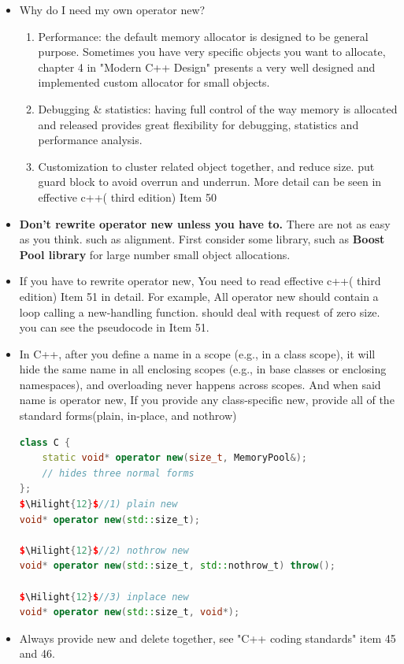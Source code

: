 \documentclass[a4paper,12pt,twoside]{book}
\newcommand{\Hilight}[1]{\makebox[0pt][l]{\color{yellow}\rule[-3pt]{#1em}{11pt}}}
\begin{document}
\begin{itemize}
	\item Why do I need my own operator new?
	\begin{enumerate}
		\item Performance: the default memory allocator is designed to be general purpose. Sometimes you have very specific objects you want to allocate, chapter 4 in "Modern C++ Design" presents a very well designed and implemented custom allocator for small objects.
		
		\item Debugging \& statistics: having full control of the way memory is allocated and released provides great flexibility for debugging, statistics and performance analysis.
		
		\item Customization to cluster related object together, and reduce size. put guard block to avoid overrun and underrun. More detail can be seen in effective c++( third edition) Item 50
	\end{enumerate}
	
	\item \textbf{Don't rewrite operator new unless you have to.} There are not as easy as you think. such as alignment. First consider some library, such as \textbf{Boost Pool library} for large number small object allocations. 
	
	\item If you have to rewrite operator new, You need to read  effective c++( third edition) Item 51 in detail. For example, All operator new should contain a loop calling a new-handling function.  should deal with request of zero size. you can see the pseudocode in Item 51.
	
	\item In C++, after you define a name in a scope (e.g., in a class scope), it will hide the same name in all enclosing scopes (e.g., in base classes or enclosing namespaces), and overloading never happens across scopes. And when said name is operator new, If you provide any class-specific new, provide all of the standard forms(plain, in-place, and nothrow)
\begin{lstlisting}[frame=single, language=c++, mathescape=true]
class C {
	static void* operator new(size_t, MemoryPool&);
	// hides three normal forms
};
$\Hilight{12}$//1) plain new
void* operator new(std::size_t);
	
$\Hilight{12}$//2) nothrow new
void* operator new(std::size_t, std::nothrow_t) throw();
	
$\Hilight{12}$//3) inplace new
void* operator new(std::size_t, void*);
\end{lstlisting}
	
	\item Always provide new and delete together, see "C++ coding standards" item 45 and 46.
\end{itemize}
\end{document}
